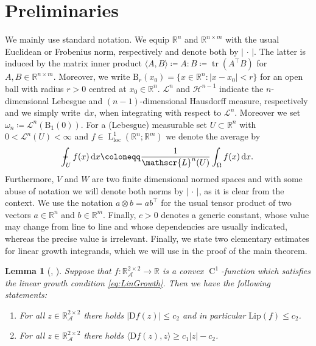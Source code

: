 \documentclass[a4paper,10pt,reqno,oneside]{amsart}
\numberwithin{equation}{section}
\newcommand{\R}{\mathbb R}
\newcommand{\ball}{\mathrm{B}}
\newcommand{\A}{\mathscr{A}}
\newcommand{\Leb}{\mathscr{L}}
\newcommand{\Hd}{\mathscr{H}}
\newcommand{\lebe}{\operatorname{L}}
\newcommand{\hold}{\operatorname{C}}
\newcommand{\loc}{\mathrm{loc}}
\newcommand{\D}{\mathrm{D}}
\DeclareMathOperator{\tr}{tr}
\newcommand{\dx}[1]{\,\mathrm{d}#1}
\newcommand{\abs}[1]{\left\lvert#1\right\rvert}
\def\Xint#1{\mathchoice
	{\XXint\displaystyle\textstyle{#1}}%
	{\XXint\textstyle\scriptstyle{#1}}%
	{\XXint\scriptstyle\scriptscriptstyle{#1}}%
	{\XXint\scriptscriptstyle\scriptscriptstyle{#1}}%
	\!\int}
\def\XXint#1#2#3{{\setbox0=\hbox{$#1{#2#3}{\int}$ }
		\vcenter{\hbox{$#2#3$ }}\kern-.6\wd0}}
\def\dashint{\Xint-}
\newtheorem{lem}[thm]{Lemma}
\begin{document}
\section{Preliminaries}\label{sec:Preliminaries}
We mainly use standard notation.  We equip $\R^n$ and $\R^{n\times m}$ with the usual Euclidean or Frobenius norm, respectively and denote both by $\abs{\,\cdot\,}$. The latter is induced by the matrix inner product $\langle A, B\rangle \coloneqq A:B\coloneqq \tr(A^\top B)$ for $A,B\in\R^{n\times m}$. 
Moreover, we write $\ball_r(x_0)=\{x\in\R^n\colon \abs{x-x_0}< r\}$ for an open ball with radius $r>0$ centred at $x_0\in\R^n$. %
$\Leb^n$ and $\Hd^{n-1}$ indicate the $n$-dimensional Lebesgue and $(n-1)$-dimensional Hausdorff measure, respectively and we simply write $\dx{x}$, when integrating with respect to $\Leb^n$. Moreover we set $\omega_n \coloneqq \Leb^n(\ball_1(0))$. For a (Lebesgue) measurable set $U\subset\R^n$ with $0<\Leb^n(U)<\infty$ and $f\in\lebe^1_\loc(\R^n;\R^m)$ we denote the average by
\begin{align*}
	\dashint_U f(x)\dx{x} \coloneqq \frac{1}{\Leb^n(U)}\int_\Omega f(x)\dx{x}.
\end{align*}
Furthermore, $V$ and $W$ are two finite dimensional normed spaces and with some abuse of notation we will denote both norms by $\abs{\,\cdot\,}$, as it is clear from the context. We use the notation $a\otimes b= ab^\top$ for the usual tensor product of two vectors $a\in\R^n$ and $b\in\R^m$. Finally, $c>0$ denotes a generic constant, whose value may change from line to line and whose dependencies are usually indicated, whereas the precise value is irrelevant. Finally, we state two elementary estimates for linear growth integrands, which we will use in the proof of the main theorem.
\begin{lem}[{\cite[Lem. 5.2]{Giusti}, \cite[Lem. 2.8]{BeckSchmidt}}]
	Suppose that $f\colon \R^{2\times 2}_\A\to \R$ is a convex $\hold^1$-function which satisfies the linear growth condition \eqref{eq:LinGrowth}. Then we have the following statements:
	\begin{enumerate}
		\item For all $z\in\R^{2\times 2}_\A$ there holds $\abs{\D f(z)} \leq c_2$ and in particular $\mathrm{Lip}(f)\leq c_2$.
		\item For all $z\in\R^{2\times 2}_\A$ there holds $\langle \D f(z),z\rangle\geq c_1\abs{z}-c_2 $.
	\end{enumerate}
\end{lem}
\end{document}
